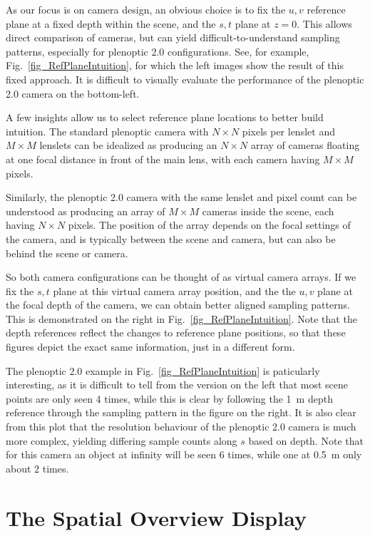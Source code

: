 \documentclass[onecolumn]{article}
\begin{document}
As our focus is on camera design, an obvious choice is to fix the $u,v$ reference plane at a fixed depth within the scene, and the $s,t$ plane at $z=0$.  This allows direct comparison of cameras, but can yield difficult-to-understand sampling patterns, especially for plenoptic 2.0 configurations.  See, for example, Fig.~\ref{fig_RefPlaneIntuition}, for which the left images show the result of this fixed approach.  It is difficult to visually evaluate the performance of the plenoptic 2.0 camera on the bottom-left.

A few insights allow us to select reference plane locations to better build intuition. The standard plenoptic camera with $N \times N$ pixels per lenslet and $M \times M$ lenslets can be idealized as producing an $N \times N$ array of cameras floating at one focal distance in front of the main lens, with each camera having $M \times M$ pixels.

Similarly, the plenoptic 2.0 camera with the same lenslet and pixel count can be understood as producing an array of $M \times M$ cameras inside the scene, each having $N \times N$ pixels.  The position of the array depends on the focal settings of the camera, and is typically between the scene and camera, but can also be behind the scene or camera.

So both camera configurations can be thought of as virtual camera arrays.  If we fix the $s,t$ plane at this virtual camera array position, and the the $u,v$ plane at the focal depth of the camera, we can obtain better aligned sampling patterns.  This is demonstrated on the right in Fig.~\ref{fig_RefPlaneIntuition}.  Note that the depth references reflect the changes to reference plane positions, so that these figures depict the exact same information, just in a different form.

The plenoptic 2.0 example in Fig.~\ref{fig_RefPlaneIntuition} is paticularly interesting, as it is difficult to tell from the version on the left that most scene points are only seen 4 times, while this is clear by following the 1~m depth reference through the sampling pattern in the figure on the right.  It is also clear from this plot that the resolution behaviour of the plenoptic 2.0 camera is much more complex, yielding differing sample counts along $s$ based on depth.  Note that for this camera an object at infinity will be seen 6 times, while one at 0.5~m only about 2 times.

\section{The Spatial Overview Display}
\end{document}
